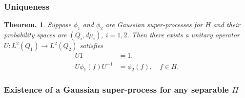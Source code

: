 \documentclass[openany, a4paper, oneside]{jsbook}
\theoremstyle{break}
\theoremstyle{breakdefn}
\newtheorem{thm}{Theorem.}[section]
\begin{document}
\subsubsection{Uniqueness}


\begin{thm}
 Suppose $\phi_1$ and $\phi_2$ are Gaussian super-processes for $H$ and their probability spaces are $(Q_i, d \mu_i)$, $i=1,2$.
 Then there exists a unitary operator $U \colon L^2 (Q_1) \to L^2 (Q_2)$ satisfies
 \begin{align}
  U1 &= 1, \\
  U \phi_1 (f) U^{-1} &= \phi_2 (f), \quad f \in H.
 \end{align}
\end{thm}
\subsubsection{Existence of a Gaussian super-process for any separable $H$}
\end{document}
